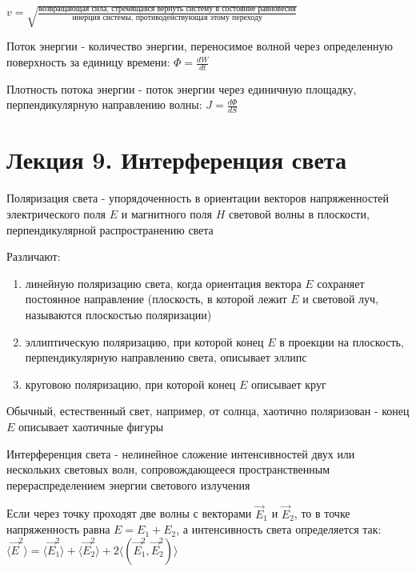 \documentclass[12pt]{article}
\begin{document}
$v = \sqrt{\frac{\text{возвращающая сила, стремящаяся вернуть систему в состояние равновесия}}{\text{инерция системы, противодействующая этому переходу}}}$

\mediumvspace

Поток энергии - количество энергии, переносимое волной через определенную поверхность за единицу времени: $\Phi = \frac{dW}{dt}$ 

Плотность потока энергии - поток энергии через единичную площадку, перпендикулярную направлению волны: $J = \frac{d\Phi}{dS}$









\section{Лекция 9. Интерференция света}

Поляризация света - упорядоченность в ориентации векторов напряженностей электрического поля $E$
и магнитного поля $H$ световой волны в плоскости, перпендикулярной распространению света

Различают: 

\begin{enumerate}
    \item линейную поляризацию света, когда ориентация вектора $E$ сохраняет постоянное направление 
(плоскость, в которой лежит $E$ и световой луч, называются плоскостью поляризации)

    \item эллиптическую поляризацию, при которой конец $E$ в проекции на плоскость, 
    перпендикулярную направлению света, описывает эллипс 

    \item круговою поляризацию, при которой конец $E$ описывает круг
\end{enumerate}

Обычный, естественный свет, например, от солнца, хаотично поляризован - конец $E$ описывает хаотичные фигуры

Интерференция света - нелинейное сложение интенсивностей двух или нескольких световых волн, 
сопровождающееся пространственным перераспределением энергии светового излучения

Если через точку проходят две волны с векторами $\vec E_1$ и $\vec E_2$, то в точке напряженность равна $E = E_1 + E_2$, 
а интенсивность света определяется так: $\langle \vec E^2 \rangle = \langle \vec E_1^2 \rangle + \langle \vec E_2^2 \rangle + 2\langle (\vec E^2_1, \vec E_2^2) \rangle$
\end{document}
